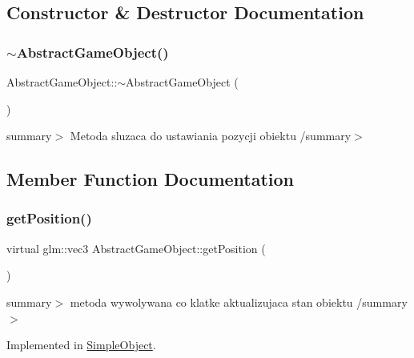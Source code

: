 \subsection{Constructor \& Destructor Documentation}
\mbox{\label{class_abstract_game_object_aaf1bae3e1afb1b7269122466d41cb350}} 
\subsubsection{\texorpdfstring{$\sim$\+Abstract\+Game\+Object()}{~AbstractGameObject()}}
{\footnotesize\ttfamily Abstract\+Game\+Object\+::$\sim$\+Abstract\+Game\+Object (\begin{DoxyParamCaption}{ }\end{DoxyParamCaption})}

summary$>$ Metoda sluzaca do ustawiania pozycji obiektu /summary$>$ 

\subsection{Member Function Documentation}
\mbox{\label{class_abstract_game_object_ac934d513fd18a520d8b68dd5a7ac7399}} 
\subsubsection{\texorpdfstring{get\+Position()}{getPosition()}}
{\footnotesize\ttfamily virtual glm\+::vec3 Abstract\+Game\+Object\+::get\+Position (\begin{DoxyParamCaption}{ }\end{DoxyParamCaption})\hspace{0.3cm}{\ttfamily [pure virtual]}}

summary$>$ metoda wywolywana co klatke aktualizujaca stan obiektu /summary$>$ 

Implemented in \hyperlink{class_simple_object_acaf96b4cf35863ca69a123d9404f4e5f}{Simple\+Object}.

\mbox{\label{class_abstract_game_object_afddc4040f2d1a7effc0e0baa9950b2e2}} 
